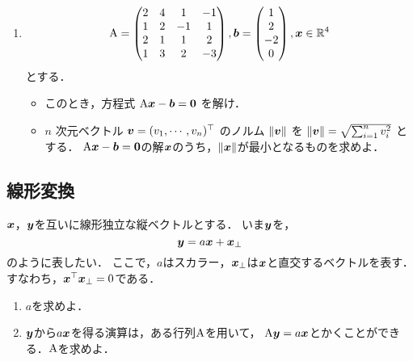 \begin{enumerate}[label=(\roman*)]
    \item
    \begin{equation}
      \mathrm{A} =
        \begin{pmatrix}
          2 & 4 & 1 & -1 \\
          1 & 2 & -1 & 1 \\
          2 & 1 & 1 & 2 \\
          1 & 3 & 2 & -3
        \end{pmatrix},
      \boldsymbol{b} =
        \begin{pmatrix}
          1 \\ 2 \\ -2 \\ 0
        \end{pmatrix},
      \boldsymbol{x} \in \mathbb{R}^4
    \end{equation}
    とする．
    \begin{itemize}
      \item このとき，方程式 $\mathrm{A} \boldsymbol{x} - \boldsymbol{b} = \boldsymbol{0}$ を解け．
      \item $n$ 次元ベクトル $\boldsymbol{v} = (v_1, \cdots, v_n)^\top$ のノルム $\|\boldsymbol{v}\|$ を
        $\|\boldsymbol{v}\| = \sqrt{\sum_{i=1}^n v_i^2}$ とする．
        $\mathrm{A} \boldsymbol{x} - \boldsymbol{b} = \boldsymbol{0}$の解$\boldsymbol{x}$のうち，$\|\boldsymbol{x}\|$が最小となるものを求めよ．
    \end{itemize}
  \end{enumerate}

\subsection{線形変換}
  $\boldsymbol{x}$，$\boldsymbol{y}$を互いに線形独立な縦ベクトルとする．
  いま$\boldsymbol{y}$を，
  \begin{equation}
    \boldsymbol{y} = a \boldsymbol{x} + \boldsymbol{x}_\perp
  \end{equation}
  のように表したい．
  ここで，$a$はスカラー，$\boldsymbol{x}_{\perp}$は$\boldsymbol{x}$と直交するベクトルを表す．
  すなわち，$\boldsymbol{x}^\top \boldsymbol{x}_{\perp} = 0$である．
  \begin{enumerate}[label=(\roman*)]
    \item $a$を求めよ．
    \item $\boldsymbol{y}$から$a \boldsymbol{x}$を得る演算は，ある行列$\mathrm{A}$を用いて，
      $\mathrm{A}\boldsymbol{y} = a \boldsymbol{x}$とかくことができる．$\mathrm{A}$を求めよ．
  \end{enumerate}


